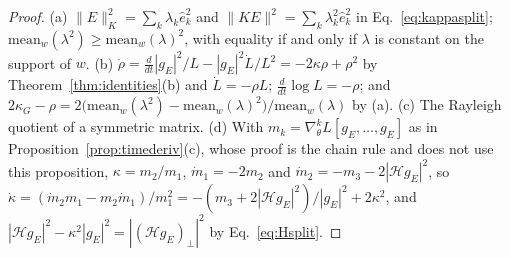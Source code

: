 \documentclass[11pt]{article}
\theoremstyle{definition}
\theoremstyle{remark}
\newcommand{\Hess}{\mathcal{H}}          %
\begin{document}
\begin{proof}
(a) $\|E\|_K^2 = \sum_k\lambda_k\hat e_k^2$ and $\|KE\|^2 = \sum_k\lambda_k^2\hat e_k^2$ in Eq.~\eqref{eq:kappasplit}; $\mathrm{mean}_w(\lambda^2)\ge\mathrm{mean}_w(\lambda)^2$, with equality if and only if $\lambda$ is constant on the support of $w$.
(b) $\dot\rho = \frac{d}{dt}|g_E|^2/L - |g_E|^2\dot L/L^2 = -2\kappa\rho + \rho^2$ by Theorem~\ref{thm:identities}(b) and $\dot L = -\rho L$; $\frac{d}{dt}\log L = -\rho$; and $2\kappa_G - \rho = 2\big(\mathrm{mean}_w(\lambda^2) - \mathrm{mean}_w(\lambda)^2\big)/\mathrm{mean}_w(\lambda)$ by (a).
(c) The Rayleigh quotient of a symmetric matrix.
(d) With $m_k = \nabla^k_\theta L[g_E,\dots,g_E]$ as in Proposition~\ref{prop:timederiv}(c), whose proof is the chain rule and does not use this proposition, $\kappa = m_2/m_1$, $\dot m_1 = -2m_2$ and $\dot m_2 = -m_3 - 2|\Hess g_E|^2$, so $\dot\kappa = (\dot m_2m_1 - m_2\dot m_1)/m_1^2 = -(m_3 + 2|\Hess g_E|^2)/|g_E|^2 + 2\kappa^2$, and $|\Hess g_E|^2 - \kappa^2|g_E|^2 = |(\Hess g_E)_\perp|^2$ by Eq.~\eqref{eq:Hsplit}.
\end{proof}
\end{document}
